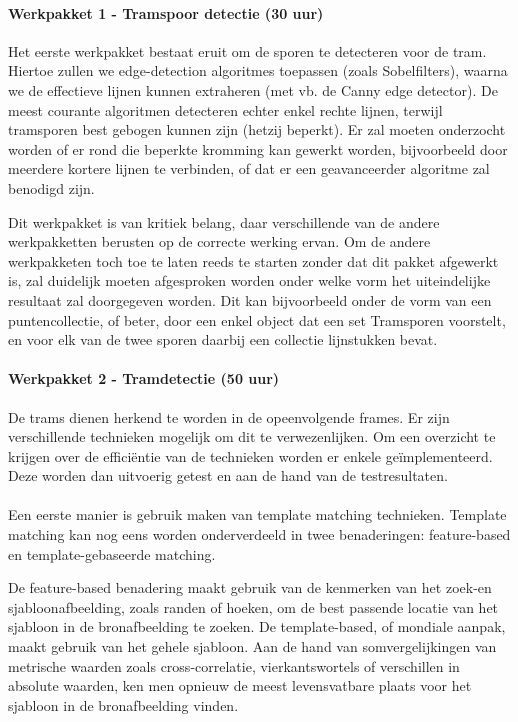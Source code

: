\documentclass[]{book}
\begin{document}
\paragraph{Werkpakket 1 - Tramspoor detectie (30 uur)}

Het eerste werkpakket bestaat eruit om de sporen te detecteren voor de tram. Hiertoe zullen we edge-detection algoritmes toepassen (zoals Sobelfilters), waarna we de effectieve lijnen kunnen extraheren (met vb. de Canny edge detector). De meest courante algoritmen detecteren echter enkel rechte lijnen, terwijl tramsporen best gebogen kunnen zijn (hetzij beperkt). Er zal moeten onderzocht worden of er rond die beperkte kromming kan gewerkt worden, bijvoorbeeld door meerdere kortere lijnen te verbinden, of dat er een geavanceerder algoritme zal benodigd zijn.

Dit werkpakket is van kritiek belang, daar verschillende van de andere werkpakketten berusten op de correcte werking ervan. Om de andere werkpakketen toch toe te laten reeds te starten zonder dat dit pakket afgewerkt is, zal duidelijk moeten afgesproken worden onder welke vorm het uiteindelijke resultaat zal doorgegeven worden. Dit kan bijvoorbeeld onder de vorm van een puntencollectie, of beter, door een enkel object dat een set Tramsporen voorstelt, en voor elk van de twee sporen daarbij een collectie lijnstukken bevat.

\paragraph{Werkpakket 2 - Tramdetectie (50 uur)}
De trams dienen herkend te worden in de opeenvolgende frames. Er zijn verschillende technieken mogelijk om dit te verwezenlijken. Om een overzicht te krijgen over de efficiëntie van de technieken worden er enkele geïmplementeerd. Deze worden dan uitvoerig getest en aan de hand van de testresultaten.
\\\\
Een eerste manier is gebruik maken van template matching technieken.
Template matching kan nog eens worden onderverdeeld in twee benaderingen: feature-based en template-gebaseerde matching. 

De feature-based benadering maakt gebruik van de kenmerken van het zoek-en sjabloonafbeelding, zoals randen of hoeken, om de best passende locatie van het sjabloon in de bronafbeelding te zoeken.
De template-based, of mondiale aanpak, maakt gebruik van het gehele sjabloon.
Aan de hand van somvergelijkingen van metrische waarden zoals cross-correlatie, vierkantswortels of 
verschillen in absolute waarden, ken men opnieuw de meest levensvatbare plaats voor het sjabloon in de bronafbeelding vinden.
 
\end{document}
